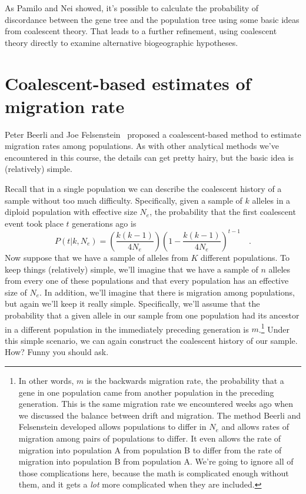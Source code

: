 \documentclass[12pt]{article}
\begin{document}
As Pamilo and Nei showed, it's possible to calculate the probability
of discordance between the gene tree and the population tree using
some basic ideas from coalescent theory. That leads to a further
refinement, using coalescent theory directly to examine alternative
biogeographic hypotheses.

\section*{Coalescent-based estimates of migration rate}

Peter Beerli and Joe
Felsenstein~\cite{Beerli-Felsenstein-1999,Beerli-Felsenstein-2001}
proposed a coalescent-based method to estimate migration rates among
populations. As with other analytical methods we've encountered in
this course, the details can get pretty hairy, but the basic idea is
(relatively) simple.

Recall that in a single population we can describe the coalescent
history of a sample without too much difficulty. Specifically, given a
sample of $k$ alleles in a diploid population with effective size
$N_e$, the probability that the first coalescent event took place $t$
generations ago is
\begin{equation}
P(t|k, N_e) = \left(\frac{k(k-1)}{4N_e}\right)\left(1-
  \frac{k(k-1)}{4N_e}\right)^{t-1} \quad . \label{eq:coalescent-single}
\end{equation}
Now suppose that we have a sample of alleles from $K$ different
populations. To keep things (relatively) simple, we'll imagine that we
have a sample of $n$ alleles from every one of these populations and
that every population has an effective size of $N_e$. In addition,
we'll imagine that there is migration among populations, but again
we'll keep it really simple. Specifically, we'll assume that the
probability that a given allele in our sample from one population had
its ancestor in a different population in the immediately preceding
generation is $m$.\footnote{In other words, $m$ is the backwards
  migration rate, the probability that a gene in one population came
  from another population in the preceding generation. This is the
  same migration rate we encountered weeks ago when we discussed the
  balance between drift and migration. The method Beerli and
  Felsenstein developed allows populations to differ in $N_e$ and
  allows rates of migration among pairs of populations to differ. It
  even allows the rate of migration into population A from population
  B to differ from the rate of migration into population B from
  population A. We're going to ignore all of those complications here,
  because the math is complicated enough without them, and it gets a
  {\it lot\/} more complicated when they are included.} Under this
simple scenario, we can again construct the coalescent history of our
sample. How? Funny you should ask.
\end{document}
